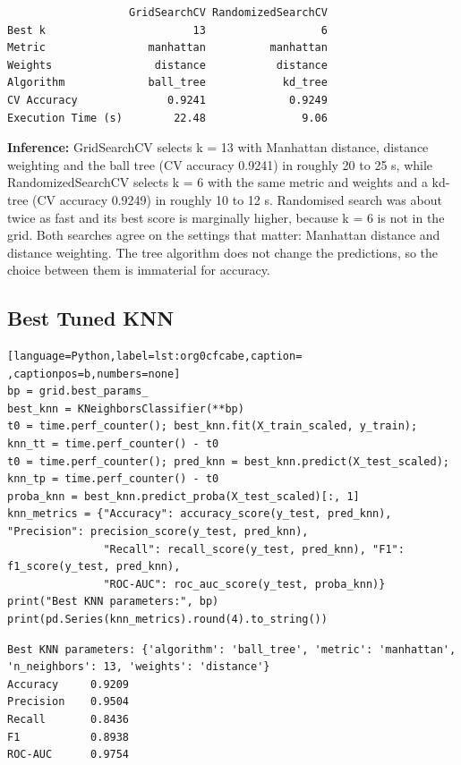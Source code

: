 \documentclass[11pt]{article}
\begin{document}
\begin{verbatim}
                   GridSearchCV RandomizedSearchCV
Best k                       13                  6
Metric                manhattan          manhattan
Weights                distance           distance
Algorithm             ball_tree            kd_tree
CV Accuracy              0.9241             0.9249
Execution Time (s)        22.48               9.06
\end{verbatim}


\textbf{Inference:} GridSearchCV selects k = 13 with Manhattan distance, distance weighting and the ball tree
(CV accuracy 0.9241) in roughly 20 to 25 s, while RandomizedSearchCV selects k = 6 with the
same metric and weights and a kd-tree (CV accuracy 0.9249) in roughly 10 to 12 s. Randomised
search was about twice as fast and its best score is marginally higher, because k = 6 is not
in the grid. Both searches agree on the settings that matter: Manhattan distance and
distance weighting. The tree algorithm does not change the predictions, so the choice
between them is immaterial for accuracy.

\subsection*{Best Tuned KNN}
\label{sec:orgedbc0da}

\begin{lstlisting}[language=Python,label=lst:org0cfcabe,caption= ,captionpos=b,numbers=none]
bp = grid.best_params_
best_knn = KNeighborsClassifier(**bp)
t0 = time.perf_counter(); best_knn.fit(X_train_scaled, y_train); knn_tt = time.perf_counter() - t0
t0 = time.perf_counter(); pred_knn = best_knn.predict(X_test_scaled); knn_tp = time.perf_counter() - t0
proba_knn = best_knn.predict_proba(X_test_scaled)[:, 1]
knn_metrics = {"Accuracy": accuracy_score(y_test, pred_knn), "Precision": precision_score(y_test, pred_knn),
               "Recall": recall_score(y_test, pred_knn), "F1": f1_score(y_test, pred_knn),
               "ROC-AUC": roc_auc_score(y_test, proba_knn)}
print("Best KNN parameters:", bp)
print(pd.Series(knn_metrics).round(4).to_string())
\end{lstlisting}

\begin{verbatim}
Best KNN parameters: {'algorithm': 'ball_tree', 'metric': 'manhattan', 'n_neighbors': 13, 'weights': 'distance'}
Accuracy     0.9209
Precision    0.9504
Recall       0.8436
F1           0.8938
ROC-AUC      0.9754
\end{verbatim}
\end{document}
